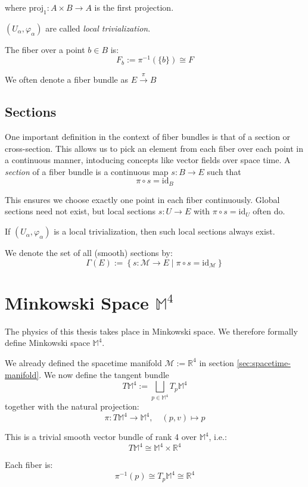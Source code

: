 where $\text{proj}_1: A \times B \to A$ is the first projection.

$(U_\alpha, \varphi_\alpha)$ are called \emph{local trivialization}.

The fiber over a point $b \in B$ is:
\[
F_b := \pi^{-1}(\{b\}) \cong F
\]

We often denote a fiber bundle as $E \xrightarrow{\pi} B$

\subsection*{Sections}

One important definition in the context of fiber bundles is that of a section or cross-section. This allows us to pick an element from each fiber over each point in a continuous manner, intoducing concepts like vector fields over space time.
A \emph{section} of a fiber bundle is a continuous map $s: B \to E$ such that
\[
\pi \circ s = \mathrm{id}_B
\]

This ensures we choose exactly one point in each fiber continuously. Global sections need not exist, but local sections $s: U \to E$ with $\pi \circ s = \mathrm{id}_U$ often do.

If $(U_\alpha, \varphi_\alpha)$ is a local trivialization, then such local sections always exist.

We denote the set of all (smooth) sections by:
\[
\Gamma(E) := \left\{ s: \mathcal{M} \to E \mid \pi \circ s = \mathrm{id}_{\mathcal{M}} \right\}
\]
\section{Minkowski Space \texorpdfstring{$\mathbb{M}^4$}{M⁴}}

The physics of this thesis takes place in Minkowski space. We therefore formally define Minkowski space $\mathbb{M}^4$.

We already defined the spacetime manifold $\mathcal{M} := \mathbb{R}^4$ in section \ref{sec:spacetime-manifold}. We now define the tangent bundle
\[
T\mathbb{M}^4 := \bigsqcup_{p \in \mathbb{M}^4} T_p \mathbb{M}^4
\]
together with the natural projection:
\[
\pi: T\mathbb{M}^4 \to \mathbb{M}^4, \quad (p, v) \mapsto p
\]

This is a trivial smooth vector bundle of rank 4 over $\mathbb{M}^4$, i.e.:
\[
T\mathbb{M}^4 \cong \mathbb{M}^4 \times \mathbb{R}^4
\]

Each fiber is:
\[
\pi^{-1}(p) \cong T_p \mathbb{M}^4 \cong \mathbb{R}^4
\]

